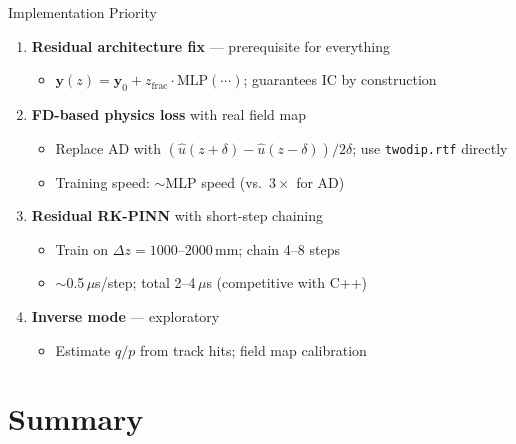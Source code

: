 \documentclass[aspectratio=169, 11pt]{beamer}
\newcommand{\vb}[1]{\bm{#1}}
\begin{document}
\begin{frame}{Implementation Priority}
  \begin{enumerate}\setlength{\itemsep}{4pt}
    \item[\textcolor{rk4red}{\textbf{P1}}] \textbf{Residual architecture fix} --- prerequisite for everything
      \begin{itemize}\setlength{\itemsep}{0pt}
        \item $\vb{y}(z) = \vb{y}_0 + z_\text{frac}\cdot\text{MLP}(\cdots)$; guarantees IC by construction
      \end{itemize}

    \item[\textcolor{rkorange}{\textbf{P2}}] \textbf{FD-based physics loss} with real field map
      \begin{itemize}\setlength{\itemsep}{0pt}
        \item Replace AD with $(\hat{u}(z{+}\delta) - \hat{u}(z{-}\delta))/2\delta$; use \texttt{twodip.rtf} directly
        \item Training speed: $\sim$MLP speed (vs.\ $3\times$ for AD)
      \end{itemize}

    \item[\textcolor{lhcbblue}{\textbf{P3}}] \textbf{Residual RK-PINN} with short-step chaining
      \begin{itemize}\setlength{\itemsep}{0pt}
        \item Train on $\Delta z = 1000$--$2000$\,mm; chain 4--8 steps
        \item $\sim$0.5\,$\mu$s/step; total 2--4\,$\mu$s (competitive with C++)
      \end{itemize}

    \item[\textcolor{nngreen}{\textbf{P4}}] \textbf{Inverse mode} --- exploratory
      \begin{itemize}\setlength{\itemsep}{0pt}
        \item Estimate $q/p$ from track hits; field map calibration
      \end{itemize}
  \end{enumerate}
\end{frame}

\section{Summary}
\end{document}
